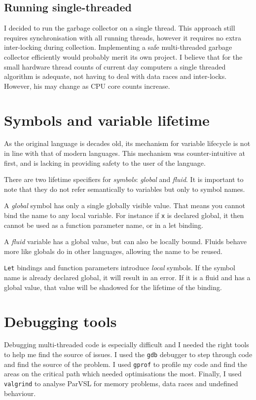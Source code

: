 \subsection{Running single-threaded}

I decided to run the garbage collector on a single thread. This approach still requires synchronisation with all running
threads, however it requires no extra inter-locking during collection. Implementing a safe multi-threaded garbage collector
efficiently would probably merit its own project. I believe that for the small hardware thread counts of current day computers
a single threaded algorithm is adequate, not having to deal with data races and inter-locks. However, his may change as
CPU core counts increase.

\section{Symbols and variable lifetime}
As the original language is decades old, its mechanism for variable lifecycle is not in line with that of modern languages.
This mechanism was counter-intuitive at first, and is lacking in providing safety to the user of the language.

There are two lifetime specifiers for \emph{symbols}: \emph{global} and \emph{fluid}. It is important to note that they
do not refer semantically to variables but only to symbol names.

A \emph{global} symbol has only a single globally visible value. That means you cannot bind the name to any local
variable. For instance if \texttt{x} is declared global, it then cannot be used as a function parameter name, or in a
let binding.

A \emph{fluid} variable has a global value, but can also be locally bound. Fluids behave more like globals do
in other languages, allowing the name to be reused.

\texttt{Let} bindings and function parameters introduce \emph{local} symbols. If the symbol name is already declared global,
it will result in an error. If it is a fluid and has a global value, that value will be shadowed for the lifetime
of the binding.

\section{Debugging tools}

Debugging multi-threaded code is especially difficult and I
needed the right tools to help me find the source of issues. I used
the \verb|gdb| \cite{gdb} debugger to step through code and find the source
of the problem. I used \verb|gprof| \cite{gprof} to profile my code and find
the areas on the critical path which needed optimisations the most. Finally,
I used \verb|valgrind| \cite{valgrind} to analyse ParVSL for memory
problems, data races and undefined behaviour.
